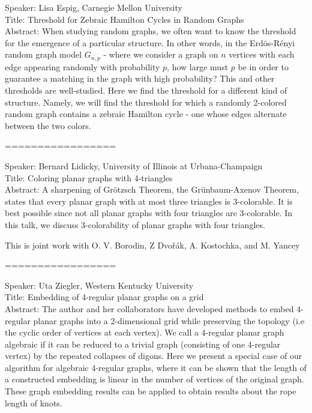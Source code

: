 \documentclass[11pt]{article}
\begin{document}
Speaker: Lisa Espig, Carnegie Mellon University\\
Title: Threshold for Zebraic Hamilton Cycles in Random Graphs\\
Abstract: When studying random graphs, we often want to know the threshold for the emergence of a particular structure. In other words, in the Erd\"os-R\'enyi random graph model $G_{n,p}$ - where we consider a graph on $n$ vertices with each edge appearing randomly with probability $p$, how large must $p$ be in order to guarantee a matching in the graph with high probability? This and other thresholds are well-studied. Here we find the threshold for a different kind of structure. Namely, we will find the threshold for which a randomly 2-colored random graph contains a zebraic Hamilton cycle - one whose edges alternate between the two colors.


=================


Speaker: Bernard Lidicky, University of Illinois at Urbana-Champaign\\
Title: Coloring planar graphs with 4-triangles\\
Abstract: A sharpening of Gr\" otzsch Theorem, the Gr\" unbaum-Axenov
Theorem, states that
every planar graph with at most three triangles is 3-colorable.
It is best possible since not all planar graphs with four triangles
are 3-colorable.
In this talk, we discuss 3-colorability of planar graphs
with four triangles.

This is joint work with O. V. Borodin, Z Dvo\v{r}\'ak, A. Kostochka, and M. Yancey


=================


Speaker: Uta Ziegler, Western Kentucky University\\
Title: Embedding of 4-regular planar graphs on a grid\\
Abstract: The author and her collaborators have developed methods to embed 4-regular planar graphs into a 2-dimensional grid while preserving the topology (i.e the cyclic order of vertices at each vertex). We call a 4-regular planar graph algebraic if it can be reduced to a trivial graph (consisting of one 4-regular vertex) by the repeated collapses of digons. Here we present a special case of our algorithm for algebraic 4-regular graphs, where it can be shown that the length of a constructed embedding is linear in the number of vertices of the original graph. These graph embedding results can be applied to obtain results about the rope length of knots.
\end{document}
